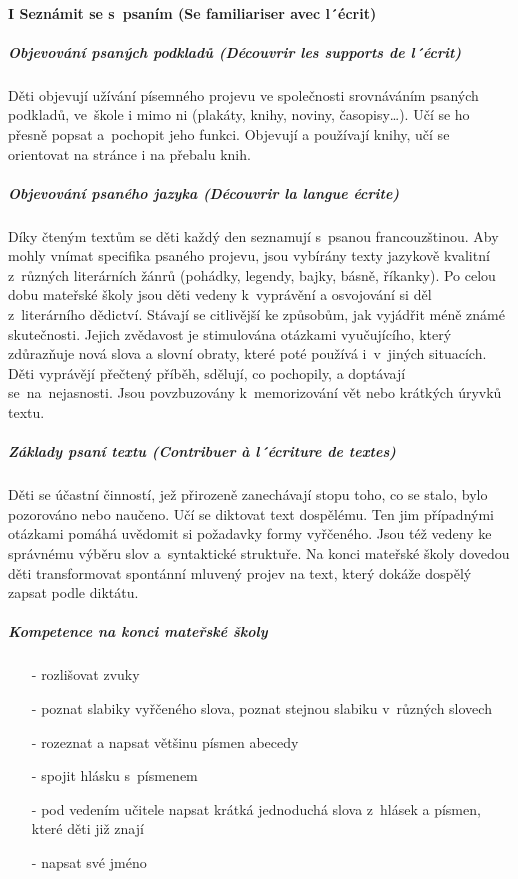 			\paragraph*{I Seznámit se s psaním (Se familiariser avec l´écrit)}
				\subparagraph{Objevování psaných podkladů (Découvrir les supports de l´écrit)}
					Děti objevují užívání písemného projevu ve společnosti srovnáváním psaných podkladů, ve škole i mimo ni (plakáty, knihy, noviny, časopisy…). Učí se ho přesně popsat a pochopit jeho funkci. Objevují a používají knihy, učí se orientovat na stránce i na přebalu knih. 
				\subparagraph{Objevování psaného jazyka (Découvrir la langue écrite)}
					Díky čteným textům se děti každý den seznamují s psanou francouzštinou. Aby mohly vnímat specifika psaného projevu, jsou vybírány texty jazykově kvalitní z různých literárních žánrů (pohádky, legendy, bajky, básně, říkanky). Po celou dobu mateřské školy jsou děti vedeny k vyprávění a osvojování si děl z literárního dědictví. Stávají se citlivější ke způsobům, jak vyjádřit méně známé skutečnosti. Jejich zvědavost je stimulována otázkami vyučujícího, který zdůrazňuje nová slova a slovní obraty, které poté používá i v jiných situacích.  Děti vyprávějí přečtený příběh, sdělují, co pochopily, a doptávají se na nejasnosti. Jsou povzbuzovány k memorizování vět nebo krátkých úryvků textu. 
				\subparagraph{Základy psaní textu (Contribuer à l´écriture de textes)}
					Děti se účastní činností, jež přirozeně zanechávají stopu toho, co se stalo, bylo pozorováno nebo naučeno. Učí se diktovat text dospělému. Ten jim případnými otázkami pomáhá uvědomit si požadavky formy vyřčeného. Jsou též vedeny ke správnému výběru slov a syntaktické struktuře. Na konci mateřské školy dovedou děti transformovat spontánní mluvený projev na text, který dokáže dospělý zapsat podle diktátu.
				\subparagraph{Kompetence na konci mateřské školy \hspace{3cm}}

				\begin{itemize}
					\setlength\itemsep{-2mm}
					\item[-] rozlišovat zvuky
					\item[-] poznat slabiky vyřčeného slova, poznat stejnou slabiku v různých slovech
					\item[-] rozeznat a napsat většinu písmen abecedy
					\item[-] spojit hlásku s písmenem
					\item[-] pod vedením učitele napsat krátká jednoduchá slova z hlásek a písmen, které děti již znají 	
					\item[-] napsat své jméno
				\end{itemize}


